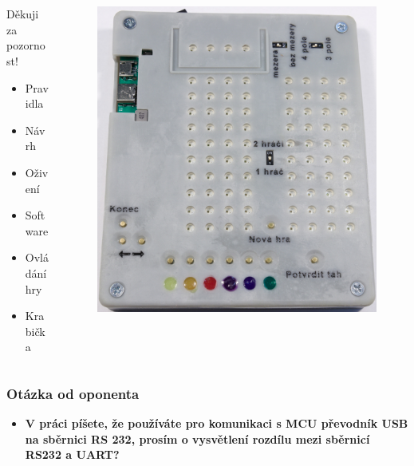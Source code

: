 \documentclass[%
  12pt,       				%
	t,                  %
	aspectratio=1610,   %
	unicode,						%
]{beamer}				    	%
\begin{document}
\begin{frame} 
	\frametitle{\mbox{ }}
	\begin{columns}[T] %
		\begin{column}{0.3\textwidth}		%
			\vspace{0.7cm}
			\centering
			{\Huge Děkuji za pozornost!}
			\vspace{0.7cm}
			\begin{itemize}
				\item Pravidla
				\item Návrh
				\item Oživení
				\item Software
				\item Ovládání hry
				\item Krabička
			\end{itemize}
		\end{column}
		\begin{column}{0.7\textwidth}		%
			\begin{figure}%
				\centering
				\includegraphics[width=0.6\columnwidth]{obrazky/Kompletace.jpg}
			\end{figure}
		\end{column}
	\end{columns}	
\end{frame}

\begin{frame} 
	\frametitle{Otázka od oponenta}
	\begin{itemize}
		\item {\bf V práci píšete, že používáte pro komunikaci s MCU převodník USB na sběrnici RS 232, prosím o vysvětlení rozdílu mezi sběrnicí RS232 a UART? }
	\end{itemize}	
\end{frame}

\end{document}

